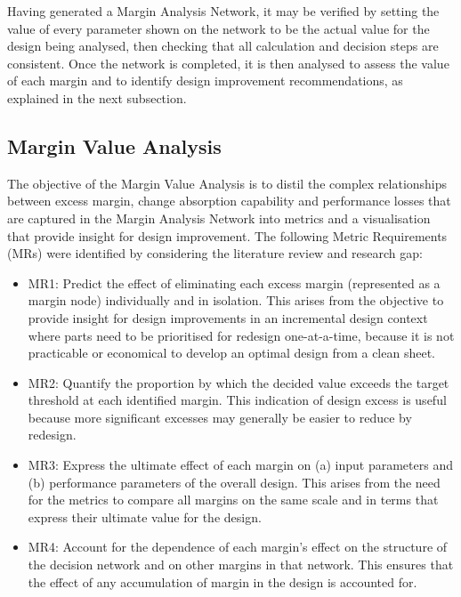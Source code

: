Having generated a Margin Analysis Network, it may be verified by setting the value of every parameter shown on the network to be the actual value for the design being analysed, then checking that all calculation and decision steps are consistent. Once the network is completed, it is then analysed to assess the value of each margin and to identify design improvement recommendations, as explained in the next subsection.

\subsection{Margin Value Analysis}\label{mvanalysis}

The objective of the Margin Value Analysis is to distil the complex relationships between excess margin, change absorption capability and performance losses that are captured in the Margin Analysis Network into metrics and a visualisation that provide insight for design improvement. The following Metric Requirements (MRs) were identified by considering the literature review and research gap:

\begin{itemize}

\item MR1: Predict the effect of eliminating each excess margin (represented as a margin node) individually and in isolation. This arises from the objective to provide insight for design improvements in an incremental design context where parts need to be prioritised for redesign one-at-a-time, because it is not practicable or economical to develop an optimal design from a clean sheet.

\item MR2: Quantify the proportion by which the decided value exceeds the target threshold at each identified margin. This indication of design excess is useful because more significant excesses may generally be easier to reduce by redesign.

\item MR3: Express the ultimate effect of each margin on (a) input parameters and (b) performance parameters of the overall design. This arises from the need for the metrics to compare all margins on the same scale and in terms that express their ultimate value for the design.

\item MR4: Account for the dependence of each margin's effect on the structure of the decision network and on other margins in that network. This ensures that the effect of any accumulation of margin in the design is accounted for.

\end{itemize}

